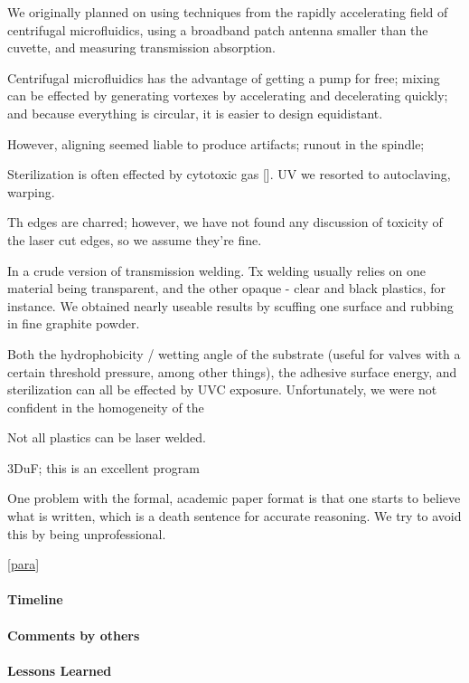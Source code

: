 \documentclass[paper.tex]{subfiles}
\begin{document}
We originally planned on using techniques from the rapidly accelerating field of centrifugal microfluidics, using a broadband patch antenna smaller than the cuvette, and measuring transmission absorption.

Centrifugal microfluidics has the advantage of getting a pump for free; mixing can be effected by generating vortexes by accelerating and decelerating quickly; and because everything is circular, it is easier to design equidistant.

However, aligning seemed liable to produce artifacts; runout in the spindle;


Sterilization is often effected by cytotoxic gas []. UV we resorted to autoclaving, warping.

Th edges are charred; however, we have not found any discussion of toxicity of the laser cut edges, so we assume they're fine.


In a crude version of transmission welding. Tx welding usually relies on one material being transparent, and the other opaque - clear and black plastics, for instance. We obtained nearly useable results by scuffing one surface and rubbing in fine graphite powder.

Both the hydrophobicity / wetting angle of the substrate (useful for valves with a certain threshold pressure, among other things), the adhesive surface energy, and sterilization can all be effected by UVC exposure. Unfortunately, we were not confident in the homogeneity of the 

Not all plastics can be laser welded.

3DuF; this is an excellent program 


One problem with the formal, academic paper format is that one starts to believe what is written, which is a death sentence for accurate reasoning. We try to avoid this by being unprofessional.

\label{para}
\ref{para}

\paragraph{Timeline}

\paragraph{Comments by others}

\paragraph{Lessons Learned} \
\end{document}

